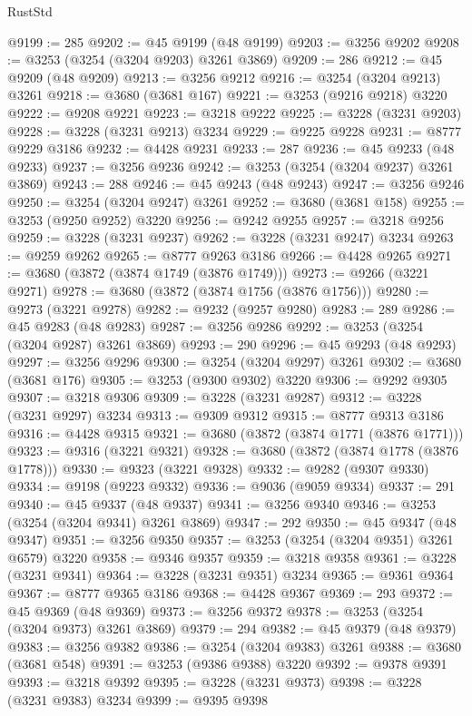 \begin{lexlean}{RustStd}
\begin{coremodule}
{\begin{coremodule}
{{{{{{{{{{{{{{{{{{{{{{{{{{{{{{{{{{{{{@9199 := 285
@9202 := @45 @9199 (@48 @9199)
@9203 := @3256 @9202
@9208 := @3253 (@3254 (@3204 @9203) @3261 @3869)
@9209 := 286
@9212 := @45 @9209 (@48 @9209)
@9213 := @3256 @9212
@9216 := @3254 (@3204 @9213) @3261
@9218 := @3680 (@3681 @167)
@9221 := @3253 (@9216 @9218) @3220
@9222 := @9208 @9221
@9223 := @3218 @9222
@9225 := @3228 (@3231 @9203)
@9228 := @3228 (@3231 @9213) @3234
@9229 := @9225 @9228
@9231 := @8777 @9229 @3186
@9232 := @4428 @9231
@9233 := 287
@9236 := @45 @9233 (@48 @9233)
@9237 := @3256 @9236
@9242 := @3253 (@3254 (@3204 @9237) @3261 @3869)
@9243 := 288
@9246 := @45 @9243 (@48 @9243)
@9247 := @3256 @9246
@9250 := @3254 (@3204 @9247) @3261
@9252 := @3680 (@3681 @158)
@9255 := @3253 (@9250 @9252) @3220
@9256 := @9242 @9255
@9257 := @3218 @9256
@9259 := @3228 (@3231 @9237)
@9262 := @3228 (@3231 @9247) @3234
@9263 := @9259 @9262
@9265 := @8777 @9263 @3186
@9266 := @4428 @9265
@9271 := @3680 (@3872 (@3874 @1749 (@3876 @1749)))
@9273 := @9266 (@3221 @9271)
@9278 := @3680 (@3872 (@3874 @1756 (@3876 @1756)))
@9280 := @9273 (@3221 @9278)
@9282 := @9232 (@9257 @9280)
@9283 := 289
@9286 := @45 @9283 (@48 @9283)
@9287 := @3256 @9286
@9292 := @3253 (@3254 (@3204 @9287) @3261 @3869)
@9293 := 290
@9296 := @45 @9293 (@48 @9293)
@9297 := @3256 @9296
@9300 := @3254 (@3204 @9297) @3261
@9302 := @3680 (@3681 @176)
@9305 := @3253 (@9300 @9302) @3220
@9306 := @9292 @9305
@9307 := @3218 @9306
@9309 := @3228 (@3231 @9287)
@9312 := @3228 (@3231 @9297) @3234
@9313 := @9309 @9312
@9315 := @8777 @9313 @3186
@9316 := @4428 @9315
@9321 := @3680 (@3872 (@3874 @1771 (@3876 @1771)))
@9323 := @9316 (@3221 @9321)
@9328 := @3680 (@3872 (@3874 @1778 (@3876 @1778)))
@9330 := @9323 (@3221 @9328)
@9332 := @9282 (@9307 @9330)
@9334 := @9198 (@9223 @9332)
@9336 := @9036 (@9059 @9334)
@9337 := 291
@9340 := @45 @9337 (@48 @9337)
@9341 := @3256 @9340
@9346 := @3253 (@3254 (@3204 @9341) @3261 @3869)
@9347 := 292
@9350 := @45 @9347 (@48 @9347)
@9351 := @3256 @9350
@9357 := @3253 (@3254 (@3204 @9351) @3261 @6579) @3220
@9358 := @9346 @9357
@9359 := @3218 @9358
@9361 := @3228 (@3231 @9341)
@9364 := @3228 (@3231 @9351) @3234
@9365 := @9361 @9364
@9367 := @8777 @9365 @3186
@9368 := @4428 @9367
@9369 := 293
@9372 := @45 @9369 (@48 @9369)
@9373 := @3256 @9372
@9378 := @3253 (@3254 (@3204 @9373) @3261 @3869)
@9379 := 294
@9382 := @45 @9379 (@48 @9379)
@9383 := @3256 @9382
@9386 := @3254 (@3204 @9383) @3261
@9388 := @3680 (@3681 @548)
@9391 := @3253 (@9386 @9388) @3220
@9392 := @9378 @9391
@9393 := @3218 @9392
@9395 := @3228 (@3231 @9373)
@9398 := @3228 (@3231 @9383) @3234
@9399 := @9395 @9398
}}}}}}}}}}}}}}}}}}}}}}}}}}}}}}}}}}}}}
\end{coremodule}}
\end{coremodule}
\end{lexlean}
